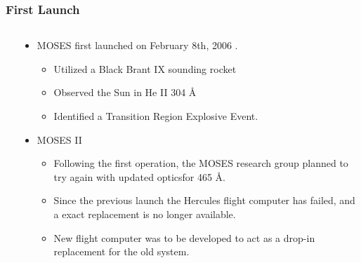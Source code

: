 \documentclass[landscape,xcolor={table},10pt]{beamer}
\begin{document}
\begin{frame}
\begin{columns}[T]
\begin{column}{.48\textwidth}
		\end{column}%
		\end{columns}

	\end{frame}
	
	\begin{frame}
		
		\frametitle{First Launch}
		
		\begin{columns}[T] %
		\begin{column}{.15\textwidth}

			
		\end{column}%
		\hfill%
		\begin{column}{.83\textwidth}
		
			\begin{itemize}
				\item MOSES first launched on February 8th, 2006 \cite{moses}.
				\begin{itemize}
					\item Utilized a Black Brant IX sounding rocket
					\item Observed the Sun in He II 304 \AA
					\item Identified a Transition Region Explosive Event.
				\end{itemize}
				\item MOSES II
				\begin{itemize}
					\item Following the first operation, the MOSES research group planned to try again with updated opticsfor 465 \AA.
					\item Since the previous launch the Hercules flight computer has failed, and a exact replacement is no longer available.
					\item New flight computer was to be developed to act as a drop-in replacement for the old system.
				\end{itemize}
			\end{itemize}
		
		\end{column}%
		\end{columns}
	
	\end{frame}
		
\end{document}
